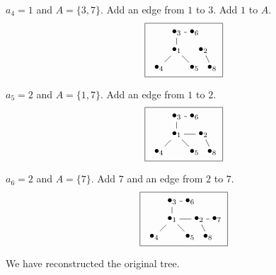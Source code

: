 \documentclass[12pt]{article}
\begin{document}
$a_4=1$ and $A=\{3,7\}$. Add an edge from $1$ to $3$. Add $1$ to $A$.
\[ \fbox{ \xygraph{
!{(0,0)   }*+{\bullet_{4}}="4"
!{(0.5,0.5) }*+{\bullet_{1}}="1"
!{(0.5,1) }*+{\bullet_{3}}="3"
!{(1,1)   }*+{\bullet_{6}}="6"
!{(1.25,.5)   }*+{\bullet_{2}}="2"
!{(1,0)   }*+{\bullet_{5}}="5"
!{(1.5,0) }*+{\bullet_{8}}="8"
"1"-"3" "1"-"4" "1"-"5"
"3"-"6"
"2"-"8"
} } \]

$a_5=2$ and $A=\{1,7\}$. Add an edge from $1$ to $2$.
\[ \fbox{ \xygraph{
!{(0,0)   }*+{\bullet_{4}}="4"
!{(0.5,0.5) }*+{\bullet_{1}}="1"
!{(0.5,1) }*+{\bullet_{3}}="3"
!{(1,1)   }*+{\bullet_{6}}="6"
!{(1.25,.5)   }*+{\bullet_{2}}="2"
!{(1,0)   }*+{\bullet_{5}}="5"
!{(1.5,0) }*+{\bullet_{8}}="8"
"1"-"2" "1"-"3" "1"-"4" "1"-"5"
"3"-"6"
"2"-"8"
} } \]

$a_6=2$ and $A=\{7\}$. Add $7$ and an edge from $2$ to $7$.
\[ \fbox{ \xygraph{
!{(0,0)   }*+{\bullet_{4}}="4"
!{(0.5,0.5) }*+{\bullet_{1}}="1"
!{(0.5,1) }*+{\bullet_{3}}="3"
!{(1,1)   }*+{\bullet_{6}}="6"
!{(1.25,.5)   }*+{\bullet_{2}}="2"
!{(1,0)   }*+{\bullet_{5}}="5"
!{(1.75,.5) }*+{\bullet_{7}}="7"
!{(1.5,0) }*+{\bullet_{8}}="8"
"1"-"2" "1"-"3" "1"-"4" "1"-"5"
"3"-"6"
"2"-"7" "2"-"8"
} } \]

We have reconstructed the original tree.
\end{document}
